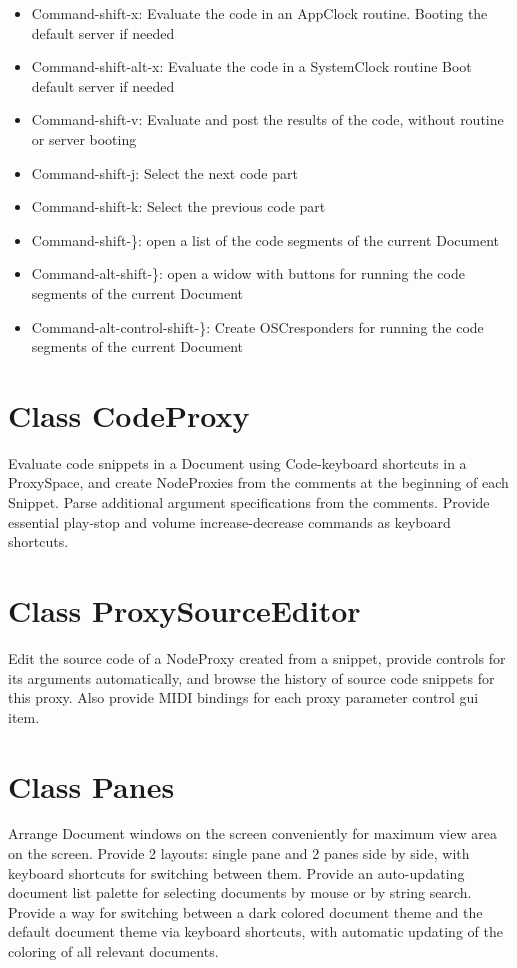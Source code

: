 \documentclass[11pt, a4paper]{scrartcl}
\begin{document}
\begin{itemize}
\item Command-shift-x: Evaluate the code in an AppClock routine. Booting the default server if needed
\item Command-shift-alt-x: Evaluate the code in a SystemClock routine Boot default server if needed
\item Command-shift-v: Evaluate and post the results of the code, without routine or server booting
\item Command-shift-j: Select the next code part
\item Command-shift-k: Select the previous code part
\item Command-shift-\}: open a list of the code segments of the current Document
\item Command-alt-shift-\}: open a widow with buttons for running the code segments of the current Document
\item Command-alt-control-shift-\}: Create OSCresponders for running the code segments of the current Document
\end{itemize}
\section*{Class CodeProxy}
\label{sec-9}


Evaluate code snippets in a Document using Code-keyboard shortcuts in a ProxySpace, and create NodeProxies from the comments at the beginning of each Snippet. Parse additional argument specifications from the comments.  Provide essential play-stop and volume increase-decrease commands as keyboard shortcuts. 
\section*{Class ProxySourceEditor}
\label{sec-10}


Edit the source code of a NodeProxy created from a snippet, provide controls for its arguments automatically, and browse the history of source code snippets for this proxy.  Also provide MIDI bindings for each proxy parameter control gui item. 
\section*{Class Panes}
\label{sec-11}


Arrange Document windows on the screen conveniently for maximum view area on the screen. Provide 2 layouts: single pane and 2 panes side by side, with keyboard shortcuts for switching between them. Provide an auto-updating document list palette for selecting documents by mouse or by string search. Provide a way for switching between a dark colored document theme and the default document theme via keyboard shortcuts, with automatic updating of the coloring of all relevant documents. 
\end{document}
